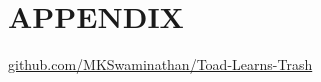 \documentclass{article}
\begin{document}
\section{APPENDIX}
\label{sec:appendix}

\url{github.com/MKSwaminathan/Toad-Learns-Trash}






\end{document}
